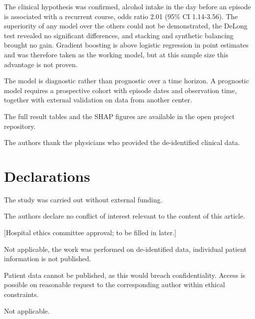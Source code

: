 \documentclass[pdflatex,sn-basic,Numbered]{sn-jnl}
\begin{document}
The clinical hypothesis was confirmed, alcohol intake in the day before an episode is associated with a recurrent course, odds ratio 2.01 (95\% CI 1.14-3.56). The superiority of any model over the others could not be demonstrated, the DeLong test revealed no significant differences, and stacking and synthetic balancing brought no gain. Gradient boosting is above logistic regression in point estimates and was therefore taken as the working model, but at this sample size this advantage is not proven.

The model is diagnostic rather than prognostic over a time horizon. A prognostic model requires a prospective cohort with episode dates and observation time, together with external validation on data from another center.

\backmatter


The full result tables and the SHAP figures are available in the open project repository.


The authors thank the physicians who provided the de-identified clinical data.

\section*{Declarations}


The study was carried out without external funding.


The authors declare no conflict of interest relevant to the content of this article.


[Hospital ethics committee approval; to be filled in later.]


Not applicable, the work was performed on de-identified data, individual patient information is not published.


Patient data cannot be published, as this would breach confidentiality. Access is possible on reasonable request to the corresponding author within ethical constraints.


Not applicable.
\end{document}
